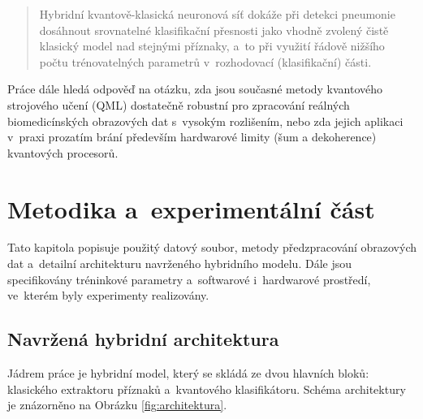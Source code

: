 \documentclass[12pt, a4paper]{report}
\begin{document}
\begin{quote}
Hybridní kvantově-klasická neuronová síť dokáže při detekci pneumonie
dosáhnout srovnatelné klasifikační přesnosti jako vhodně zvolený čistě
klasický model nad stejnými příznaky, a~to při využití řádově nižšího počtu
trénovatelných parametrů v~rozhodovací (klasifikační) části.
\end{quote}

Práce dále hledá odpověď na otázku, zda jsou současné metody kvantového
strojového učení (QML) dostatečně robustní pro zpracování reálných
biomedicínských obrazových dat s~vysokým rozlišením, nebo zda jejich
aplikaci v~praxi prozatím brání především hardwarové limity (šum a
dekoherence) kvantových procesorů.

\chapter{Metodika a~experimentální část} \label{chap:metodika}

Tato kapitola popisuje použitý datový soubor, metody předzpracování obrazových dat a~detailní architekturu navrženého hybridního modelu.
Dále jsou specifikovány tréninkové parametry a~softwarové i~hardwarové prostředí, ve~kterém byly experimenty realizovány.

\section{Navržená hybridní architektura}
Jádrem práce je hybridní model, který se skládá ze dvou hlavních bloků: klasického extraktoru příznaků a~kvantového klasifikátoru.
Schéma architektury je znázorněno na Obrázku \ref{fig:architektura}.
\end{document}
